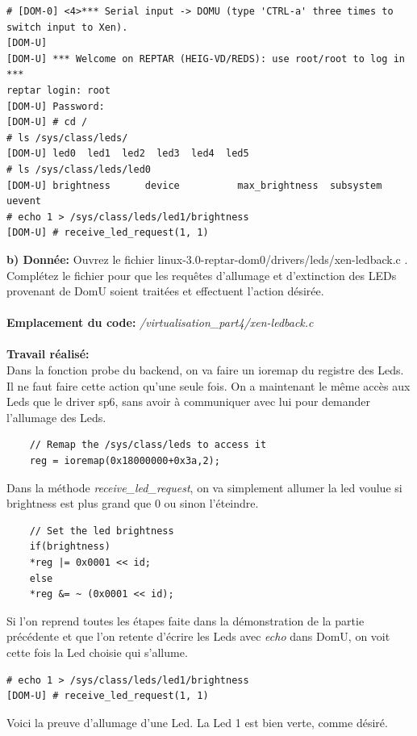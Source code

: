\begin{lstlisting}
# [DOM-0] <4>*** Serial input -> DOMU (type 'CTRL-a' three times to switch input to Xen).
[DOM-U] 
[DOM-U] *** Welcome on REPTAR (HEIG-VD/REDS): use root/root to log in ***
reptar login: root
[DOM-U] Password: 
[DOM-U] # cd /
# ls /sys/class/leds/
[DOM-U] led0  led1  led2  led3  led4  led5
# ls /sys/class/leds/led0
[DOM-U] brightness      device          max_brightness  subsystem       uevent
# echo 1 > /sys/class/leds/led1/brightness 
[DOM-U] # receive_led_request(1, 1)
\end{lstlisting}
\textbf{b) Donnée: }Ouvrez le fichier linux-3.0-reptar-dom0/drivers/leds/xen-ledback.c . Complétez le fichier pour que
les requêtes d’allumage et d’extinction des LEDs provenant de DomU soient traitées et effectuent
l’action désirée.\\\\
\textbf{Emplacement du code: }\textit{/virtualisation\_part4/xen-ledback.c}\\\\
\textbf{Travail réalisé: }\\
Dans la fonction probe du backend, on va faire un ioremap du registre des Leds. Il ne faut faire cette action qu'une seule fois. On a maintenant le même accès aux Leds que le driver sp6, sans avoir à communiquer avec lui pour demander l'allumage des Leds.
\begin{lstlisting}
	// Remap the /sys/class/leds to access it
	reg = ioremap(0x18000000+0x3a,2);
\end{lstlisting}
Dans la méthode \textit{receive\_led\_request}, on va simplement allumer la led voulue si brightness est plus grand que 0 ou sinon l'éteindre.
\begin{lstlisting}
	// Set the led brightness
	if(brightness)
	*reg |= 0x0001 << id;
	else
	*reg &= ~ (0x0001 << id);
\end{lstlisting}
Si l'on reprend toutes les étapes faite dans la démonstration de la partie précédente et que l'on retente d'écrire les Leds avec \textit{echo} dans DomU, on voit cette fois la Led choisie qui s'allume.
\begin{lstlisting}
# echo 1 > /sys/class/leds/led1/brightness 
[DOM-U] # receive_led_request(1, 1)
\end{lstlisting}
Voici la preuve d'allumage d'une Led. La Led 1 est bien verte, comme désiré.

